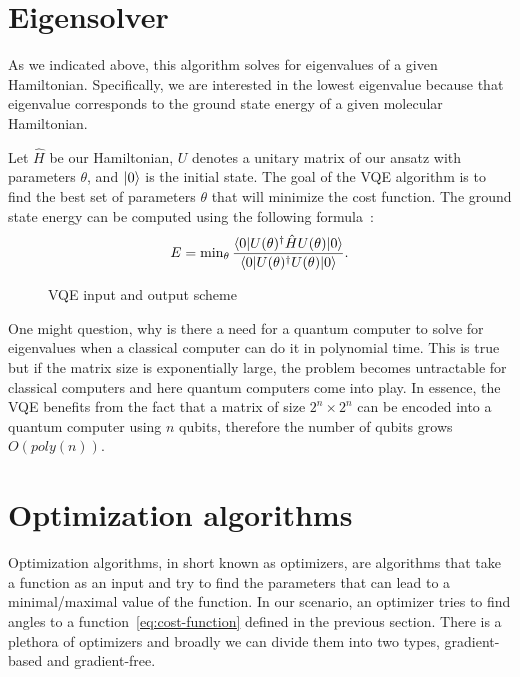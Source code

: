 \section{Eigensolver}
As we indicated above, this algorithm solves for eigenvalues of a given Hamiltonian. Specifically, we are interested in the lowest eigenvalue because that eigenvalue corresponds to the ground state energy of a given molecular Hamiltonian. 

Let $\hat{H}$ be our Hamiltonian, $U$ denotes a unitary matrix of our ansatz with parameters $\theta$, and $\lvert0\rangle$ is the initial state. The goal of the VQE algorithm is to find the best set of parameters $\theta$ that will minimize the cost function. The ground state energy can be computed using the following formula~\cite{vqe_method}:
\begin{equation}\label{eq:cost-function}
E = \min\nolimits_{\theta} \frac{\langle0\rvert U(\theta)^\dag \hat{H} U(\theta) \lvert0\rangle}{\langle0\rvert U(\theta)^\dag U(\theta) \lvert0\rangle} \text{.}
\end{equation}

\begin{figure}[H] 
    \caption{VQE input and output scheme}
\end{figure}

One might question, why is there a need for a quantum computer to solve for eigenvalues when a classical computer can do it in polynomial time. This is true but if the matrix size is exponentially large, the problem becomes untractable for classical computers and here quantum computers come into play. In essence, the VQE benefits from the fact that a matrix of size $2^n \times 2^n$ can be encoded into a quantum computer using $n$ qubits, therefore the number of qubits grows $O(poly(n))$. 

\section{Optimization algorithms}
Optimization algorithms, in short known as optimizers, are algorithms that take a function as an input and try to find the parameters that can lead to a minimal/maximal value of the function. In our scenario, an optimizer tries to find angles to a function~\ref{eq:cost-function} defined in the previous section. There is a plethora of optimizers and broadly we can divide them into two types, gradient-based and gradient-free.

